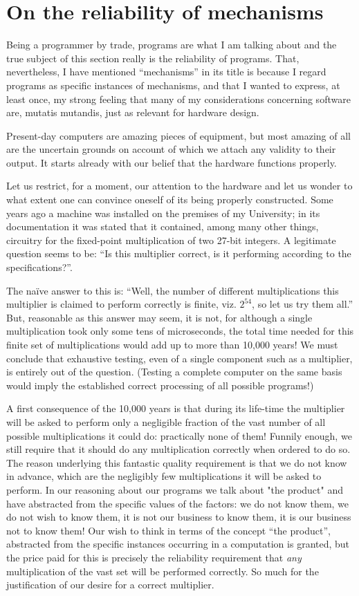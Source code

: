 \section{On the reliability of mechanisms}

Being a programmer by trade, programs are what I am talking about and the true subject of this section really is the reliability of programs. That, nevertheless, I have mentioned ``mechanisms'' in its title is because I regard programs as specific instances of mechanisms, and that I wanted to express, at least once, my strong feeling that many of my considerations concerning software are, mutatis mutandis, just as relevant for hardware design.

Present-day computers are amazing pieces of equipment, but most amazing of all are the uncertain grounds on account of which we attach any validity to their output. It starts already with our belief that the hardware functions properly.

Let us restrict, for a moment, our attention to the hardware and let us wonder to what extent one can convince oneself of its being properly constructed. Some years ago a machine was installed on the premises of my University; in its documentation it was stated that it contained, among many other things, circuitry for the fixed-point multiplication of two 27-bit integers. A legitimate question seems to be: ``Is this multiplier correct, is it performing according to the specifications?''.

The naïve answer to this is: ``Well, the number of different multiplications this multiplier is claimed to perform correctly is finite, viz. $2^{54}$, so let us try them all.'' But, reasonable as this answer may seem, it is not, for although a single multiplication took only some tens of microseconds, the total time needed for this finite set of multiplications would add up to more than 10,000 years! We must conclude that exhaustive testing, even of a single component such as a multiplier, is entirely out of the question. (Testing a complete computer on the same basis would imply the established correct processing of all possible programs!)

A first consequence of the 10,000 years is that during its life-time the multiplier will be asked to perform only a negligible fraction of the vast number of all possible multiplications it could do: practically none of them! Funnily enough, we still require that it should do any multiplication correctly when ordered to do so. The reason underlying this fantastic quality requirement is that we do not know in advance, which are the negligibly few multiplications it will be asked to perform. In our reasoning about our programs we talk about "the product" and have abstracted from the specific values of the factors: we do not know them, we do not wish to know them, it is not our business to know them, it is our business not to know them! Our wish to think in terms of the concept ``the product'', abstracted from the specific instances occurring in a computation is granted, but the price paid for this is precisely the reliability requirement that \textit{any} multiplication of the vast set will be performed correctly. So much for the justification of our desire for a correct multiplier.

